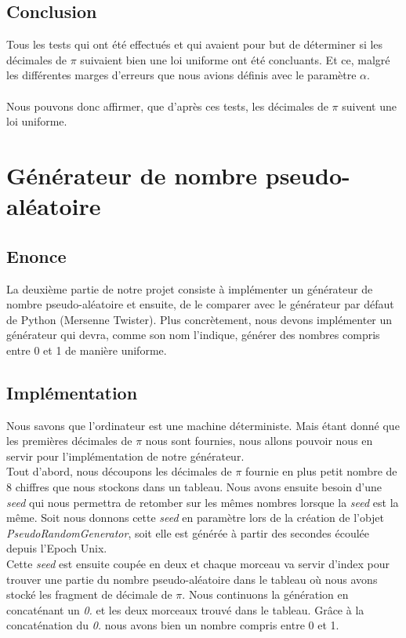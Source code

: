 \documentclass[french]{article}
\begin{document}
\subsection{Conclusion}
Tous les tests qui ont été effectués et qui avaient pour but de déterminer si les décimales de $\pi$ suivaient bien une loi uniforme ont été concluants. Et ce, malgré les différentes marges d'erreurs que nous avions définis avec le paramètre $\alpha$.
\\
\\
Nous pouvons donc affirmer, que d'après ces tests, les décimales de $\pi$ suivent une loi uniforme.
\newpage
\section{Générateur de nombre pseudo-aléatoire}
\subsection{Enonce}
La deuxième partie de notre projet consiste à implémenter un générateur de nombre pseudo-aléatoire et ensuite, de le comparer avec le générateur par défaut de Python (Mersenne Twister). Plus concrètement, nous devons implémenter un générateur qui devra, comme son nom l'indique, générer des nombres compris entre 0 et 1
de manière uniforme.

\subsection{Implémentation}
Nous savons que l'ordinateur est une machine déterministe. 
Mais étant donné que les premières décimales de  $\pi$ nous sont fournies, nous allons pouvoir nous en servir pour l'implémentation de notre générateur.
\\
Tout d'abord, nous découpons les décimales de $\pi$ fournie en plus petit nombre de 8 chiffres que nous stockons dans un tableau. Nous avons ensuite besoin d'une \textit{seed} qui nous permettra de retomber sur les mêmes nombres lorsque la \textit{seed} est la même. Soit nous donnons cette \textit{seed} en paramètre lors de la création de l'objet \textit{PseudoRandomGenerator}, soit elle est générée à partir des secondes écoulée depuis  l'Epoch Unix.
\\
Cette \textit{seed} est ensuite coupée en deux et chaque morceau va servir d'index pour trouver une partie du nombre pseudo-aléatoire dans le tableau où nous avons stocké les fragment de décimale de $\pi$. Nous continuons la génération en concaténant un \textit{0.} et les deux morceaux trouvé dans le tableau. Grâce à la concaténation du \textit{0.} nous avons bien un nombre compris entre 0 et 1.
\end{document}
